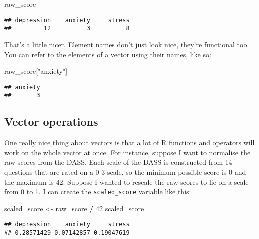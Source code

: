 \documentclass[]{book}
\newenvironment{Shaded}{\begin{snugshade}}{\end{snugshade}}
\newcommand{\DecValTok}[1]{\textcolor[rgb]{0.00,0.00,0.81}{#1}}
\newcommand{\NormalTok}[1]{#1}
\newcommand{\OperatorTok}[1]{\textcolor[rgb]{0.81,0.36,0.00}{\textbf{#1}}}
\newcommand{\StringTok}[1]{\textcolor[rgb]{0.31,0.60,0.02}{#1}}
\begin{document}
\begin{Shaded}
\begin{Highlighting}[]
\NormalTok{raw_score}
\end{Highlighting}
\end{Shaded}

\begin{verbatim}
## depression    anxiety     stress 
##         12          3          8
\end{verbatim}

That's a little nicer. Element names don't just look nice, they're functional too. You can refer to the elements of a vector using their names, like so:

\begin{Shaded}
\begin{Highlighting}[]
\NormalTok{raw_score[}\StringTok{"anxiety"}\NormalTok{]}
\end{Highlighting}
\end{Shaded}

\begin{verbatim}
## anxiety 
##       3
\end{verbatim}

\hypertarget{vector-operations}{%
\subsection{Vector operations}\label{vector-operations}}

One really nice thing about vectors is that a lot of R functions and operators will work on the whole vector at once. For instance, suppose I want to normalise the raw scores from the DASS. Each scale of the DASS is constructed from 14 questions that are rated on a 0-3 scale, so the minimum possible score is 0 and the maximum is 42. Suppose I wanted to rescale the raw scores to lie on a scale from 0 to 1. I can create the \texttt{scaled\_score} variable like this:

\begin{Shaded}
\begin{Highlighting}[]
\NormalTok{scaled_score <-}\StringTok{ }\NormalTok{raw_score }\OperatorTok{/}\StringTok{ }\DecValTok{42}
\NormalTok{scaled_score}
\end{Highlighting}
\end{Shaded}

\begin{verbatim}
## depression    anxiety     stress 
## 0.28571429 0.07142857 0.19047619
\end{verbatim}
\end{document}
